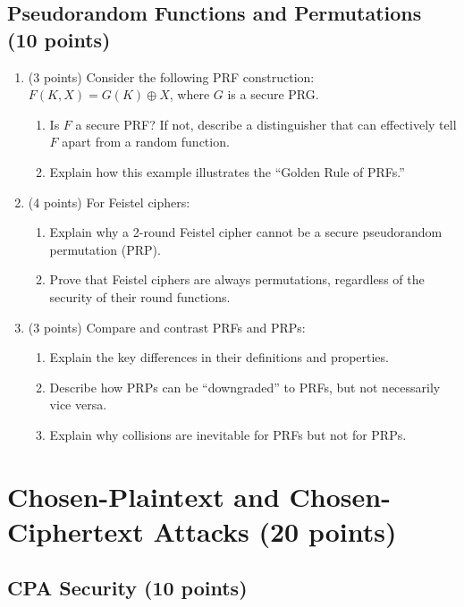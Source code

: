 \documentclass[10pt,a4paper,american]{article}
\begin{document}
\subsection{Pseudorandom Functions and Permutations (10 points)}

\begin{enumerate}
	\item (3 points) Consider the following PRF construction: $F(K, X) = G(K) \oplus X$, where $G$ is a secure PRG.
	      \begin{enumerate}
		      \item Is $F$ a secure PRF? If not, describe a distinguisher that can effectively tell $F$ apart from a random function.
		      \item Explain how this example illustrates the ``Golden Rule of PRFs.''
	      \end{enumerate}

	\item (4 points) For Feistel ciphers:
	      \begin{enumerate}
		      \item Explain why a 2-round Feistel cipher cannot be a secure pseudorandom permutation (PRP).
		      \item Prove that Feistel ciphers are always permutations, regardless of the security of their round functions.
	      \end{enumerate}

	\item (3 points) Compare and contrast PRFs and PRPs:
	      \begin{enumerate}
		      \item Explain the key differences in their definitions and properties.
		      \item Describe how PRPs can be ``downgraded'' to PRFs, but not necessarily vice versa.
		      \item Explain why collisions are inevitable for PRFs but not for PRPs.
	      \end{enumerate}
\end{enumerate}

\section{Chosen-Plaintext and Chosen-Ciphertext Attacks (20 points)}

\subsection{CPA Security (10 points)}
\end{document}
